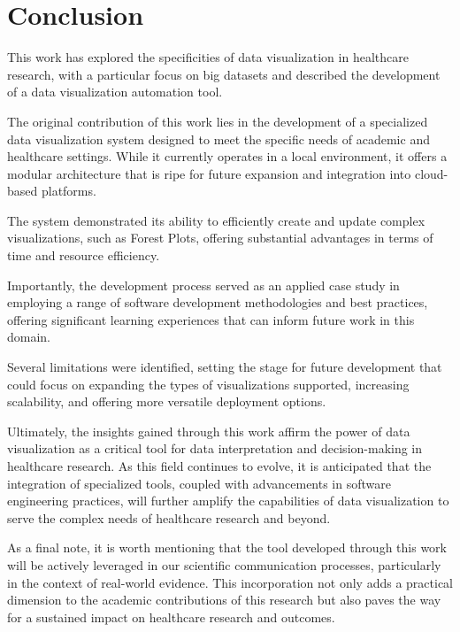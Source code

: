 \section{Conclusion}\label{conclusion}

This work has explored the specificities of data visualization in
healthcare research, with a particular focus on big datasets and
described the development of a data visualization automation tool.

The original contribution of this work lies in the development of a
specialized data visualization system designed to meet the specific
needs of academic and healthcare settings. While it currently operates
in a local environment, it offers a modular architecture that is ripe
for future expansion and integration into cloud-based platforms.

The system demonstrated its ability to efficiently create and update
complex visualizations, such as Forest Plots, offering substantial
advantages in terms of time and resource efficiency.

Importantly, the development process served as an applied case study in
employing a range of software development methodologies and best
practices, offering significant learning experiences that can inform
future work in this domain.

Several limitations were identified, setting the stage for future
development that could focus on expanding the types of visualizations
supported, increasing scalability, and offering more versatile
deployment options.

Ultimately, the insights gained through this work affirm the power of
data visualization as a critical tool for data interpretation and
decision-making in healthcare research. As this field continues to
evolve, it is anticipated that the integration of specialized tools,
coupled with advancements in software engineering practices, will
further amplify the capabilities of data visualization to serve the
complex needs of healthcare research and beyond.

As a final note, it is worth mentioning that the tool developed through
this work will be actively leveraged in our scientific communication
processes, particularly in the context of real-world evidence. This
incorporation not only adds a practical dimension to the academic
contributions of this research but also paves the way for a sustained
impact on healthcare research and outcomes.
